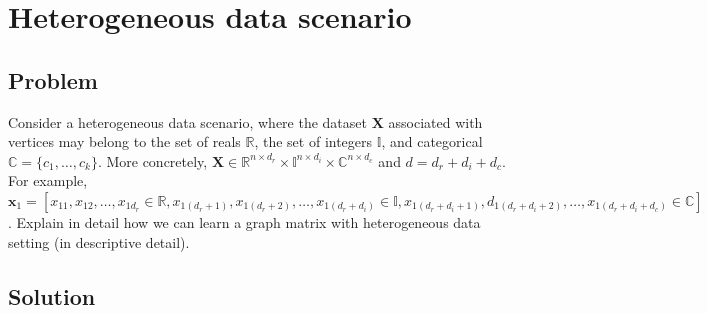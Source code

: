 \documentclass[a4paper]{article}
\newcommand{\mf}{\mathbf}
\newcommand{\mb}{\mathbb}
\newcommand{\R}{\mathbb{R}}
\begin{document}

\newpage

\section{Heterogeneous data scenario}

\subsection{Problem}

Consider a heterogeneous data scenario, where the dataset $\mf{X}$ associated with vertices may belong to the set of reals $\R$, the set of integers $\mb{I}$, and categorical $\mb{C} = \{c_1,
\ldots, c_k\}$. More concretely, $\mf{X} \in \R^{n \times d_r} \times \mb{I}^{n \times d_i} \times \mb{C}^{n \times d_c}$ and $d = d_r + d_i + d_c$. For example, $\mf{x}_1 = [x_{11}, x_{12},
\ldots, x_{1d_r} \in \R, x_{1(d_r + 1)}, x_{1(d_r + 2)}, \ldots, x_{1(d_r + d_i)} \in \mb{I}, x_{1(d_r + d_i + 1)}, d_{1(d_r + d_i + 2)}, \ldots, x_{1(d_r + d_i + d_c)} \in \mb{C}]$. Explain in
detail how we can learn a graph matrix with heterogeneous data setting (in descriptive detail).

\subsection{Solution}
\end{document}
